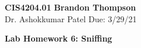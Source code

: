 \noindent
\textbf{CIS4204.01} \hfill \textbf{Brandon Thompson} \\
\normalsize Dr. Ashokkumar Patel \hfill Due: 3/29/21\\

\begin{center}
\textbf{Lab Homework 6: Sniffing}
\end{center}